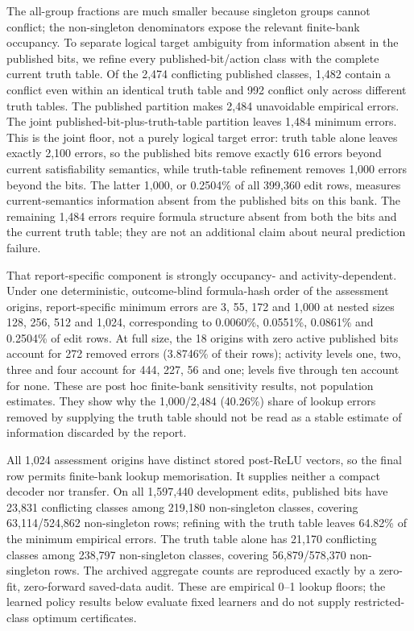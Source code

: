 \documentclass[
  british,
  11pt,
  a4paper,
]{article}
\newcounter{none} %
\begin{document}
The all-group fractions are much smaller because singleton groups cannot
conflict; the non-singleton denominators expose the relevant finite-bank
occupancy. To separate logical target ambiguity from information absent
in the published bits, we refine every published-bit/action class with
the complete current truth table. Of the 2,474 conflicting published
classes, 1,482 contain a conflict even within an identical truth table
and 992 conflict only across different truth tables. The published
partition makes 2,484 unavoidable empirical errors. The joint
published-bit-plus-truth-table partition leaves 1,484 minimum errors.
This is the joint floor, not a purely logical target error: truth table
alone leaves exactly 2,100 errors, so the published bits remove exactly
616 errors beyond current satisfiability semantics, while truth-table
refinement removes 1,000 errors beyond the bits. The latter 1,000, or
0.2504\% of all 399,360 edit rows, measures current-semantics
information absent from the published bits on this bank. The remaining
1,484 errors require formula structure absent from both the bits and the
current truth table; they are not an additional claim about neural
prediction failure.

That report-specific component is strongly occupancy- and
activity-dependent. Under one deterministic, outcome-blind formula-hash
order of the assessment origins, report-specific minimum errors are 3,
55, 172 and 1,000 at nested sizes 128, 256, 512 and 1,024, corresponding
to 0.0060\%, 0.0551\%, 0.0861\% and 0.2504\% of edit rows. At full size,
the 18 origins with zero active published bits account for 272 removed
errors (3.8746\% of their rows); activity levels one, two, three and
four account for 444, 227, 56 and one; levels five through ten account
for none. These are post hoc finite-bank sensitivity results, not
population estimates. They show why the 1,000/2,484 (40.26\%) share of
lookup errors removed by supplying the truth table should not be read as
a stable estimate of information discarded by the report.

All 1,024 assessment origins have distinct stored post-ReLU vectors, so
the final row permits finite-bank lookup memorisation. It supplies
neither a compact decoder nor transfer. On all 1,597,440 development
edits, published bits have 23,831 conflicting classes among 219,180
non-singleton classes, covering 63,114/524,862 non-singleton rows;
refining with the truth table leaves 64.82\% of the minimum empirical
errors. The truth table alone has 21,170 conflicting classes among
238,797 non-singleton classes, covering 56,879/578,370 non-singleton
rows. The archived aggregate counts are reproduced exactly by a
zero-fit, zero-forward saved-data audit. These are empirical 0--1 lookup
floors; the learned policy results below evaluate fixed learners and do
not supply restricted-class optimum certificates.
\end{document}
